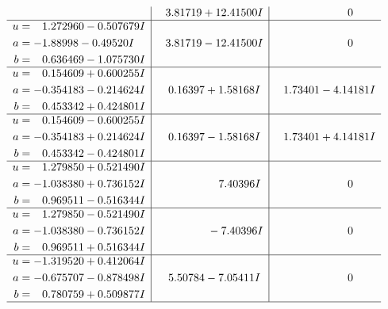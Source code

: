 \documentclass[1p]{elsarticle_modified}
\theoremstyle{definition}
\begin{document}
$$\begin{array}{c|c|c}
 & \phantom{-}3.81719 + 12.41500 I & \phantom{-0.000000 } 0 \\ \hline\begin{aligned}
u &= \phantom{-}1.272960 - 0.507679 I \\
a &= -1.88998 - 0.49520 I \\
b &= \phantom{-}0.636469 - 1.075730 I\end{aligned}
 & \phantom{-}3.81719 - 12.41500 I & \phantom{-0.000000 } 0 \\ \hline\begin{aligned}
u &= \phantom{-}0.154609 + 0.600255 I \\
a &= -0.354183 - 0.214624 I \\
b &= \phantom{-}0.453342 + 0.424801 I\end{aligned}
 & \phantom{-}0.16397 + 1.58168 I & \phantom{-}1.73401 - 4.14181 I \\ \hline\begin{aligned}
u &= \phantom{-}0.154609 - 0.600255 I \\
a &= -0.354183 + 0.214624 I \\
b &= \phantom{-}0.453342 - 0.424801 I\end{aligned}
 & \phantom{-}0.16397 - 1.58168 I & \phantom{-}1.73401 + 4.14181 I \\ \hline\begin{aligned}
u &= \phantom{-}1.279850 + 0.521490 I \\
a &= -1.038380 + 0.736152 I \\
b &= \phantom{-}0.969511 - 0.516344 I\end{aligned}
 & \phantom{-0.000000 -}7.40396 I & \phantom{-0.000000 } 0 \\ \hline\begin{aligned}
u &= \phantom{-}1.279850 - 0.521490 I \\
a &= -1.038380 - 0.736152 I \\
b &= \phantom{-}0.969511 + 0.516344 I\end{aligned}
 & \phantom{-0.000000 } -7.40396 I & \phantom{-0.000000 } 0 \\ \hline\begin{aligned}
u &= -1.319520 + 0.412064 I \\
a &= -0.675707 - 0.878498 I \\
b &= \phantom{-}0.780759 + 0.509877 I\end{aligned}
 & \phantom{-}5.50784 - 7.05411 I & \phantom{-0.000000 } 0\\
 \hline 
 \end{array}$$\newpage$$\begin{array}{c|c|c}  

\end{array}$$
\end{document}
